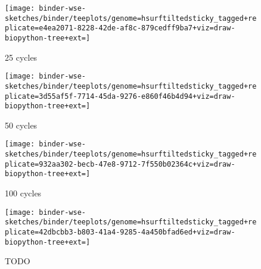 \begin{figure*}
 \begin{subfigure}[b]{\textwidth}
    \centering
    \texttt{[image: binder-wse-sketches/binder/teeplots/genome=hsurftiltedsticky\_tagged+replicate=e4ea2071-8228-42de-af8c-879cedff9ba7+viz=draw-biopython-tree+ext=]}
    \caption{25 cycles}
    \label{fig:tagged_25}
  \end{subfigure}

  \begin{subfigure}[b]{\textwidth}
    \centering
    \texttt{[image: binder-wse-sketches/binder/teeplots/genome=hsurftiltedsticky\_tagged+replicate=3d55af5f-7714-45da-9276-e860f46b4d94+viz=draw-biopython-tree+ext=]}
    \caption{50 cycles}
    \label{fig:tagged_50}
  \end{subfigure}

  \begin{subfigure}[b]{\textwidth}
    \centering
    \texttt{[image: binder-wse-sketches/binder/teeplots/genome=hsurftiltedsticky\_tagged+replicate=932aa302-becb-47e8-9712-7f550b02364c+viz=draw-biopython-tree+ext=]}
    \caption{100 cycles}
    \label{fig:tagged_100}
  \end{subfigure}

\begin{subfigure}[b]{\textwidth}
  \centering
  \texttt{[image: binder-wse-sketches/binder/teeplots/genome=hsurftiltedsticky\_tagged+replicate=42dbcbb3-b803-41a4-9285-4a450bfad6ed+viz=draw-biopython-tree+ext=]}
  \caption{250 cycles}
  \label{fig:tagged_250}

  \caption{TODO}
  \label{fig:tagged}
\end{subfigure}
\end{figure*}
